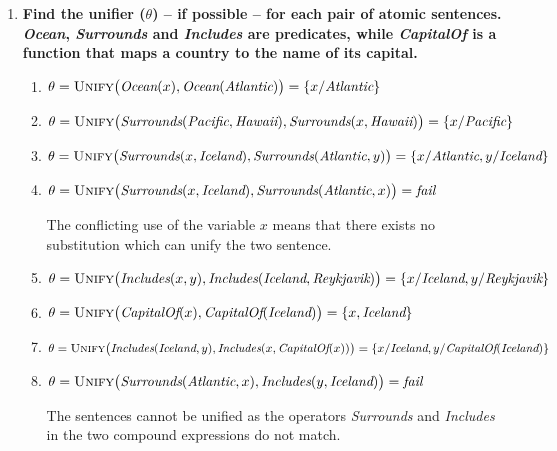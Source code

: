 \begin{enumerate}

\item \textbf{Find the unifier ($\theta$) -- if possible -- for each pair of atomic sentences. \textit{Ocean}, \textit{Surrounds} and \textit{Includes} are predicates, while \textit{CapitalOf} is a function that maps a country to the name of its capital.}

\begin{enumerate}
\item
$\theta = \textsc{Unify}\big(\textit{Ocean}(x), \textit{Ocean}(\textit{Atlantic})\big) = \{x / \textit{Atlantic}\}$

\item
$\theta = \textsc{Unify}\big(\textit{Surrounds}(\textit{Pacific}, \textit{Hawaii}), \textit{Surrounds}(x, \textit{Hawaii})\big) = \{x / \textit{Pacific}\}$

\item
$\theta = \textsc{Unify}\big(\textit{Surrounds}(x, \textit{Iceland}), \textit{Surrounds}(\textit{Atlantic}, y)\big) = \{x / \textit{Atlantic}, y / \textit{Iceland}\}$

\item
$\theta = \textsc{Unify}\big(\textit{Surrounds}(x, \textit{Iceland}), \textit{Surrounds}(\textit{Atlantic}, x)\big) = \textit{fail}$

The conflicting use of the variable $x$ means that there exists no substitution which can unify the two sentence.

\item
$\theta = \textsc{Unify}\big(\textit{Includes}(x, y), \textit{Includes}(\textit{Iceland}, \textit{Reykjavik})\big) = \{x / \textit{Iceland}, y / \textit{Reykjavik}\}$

\item
$\theta = \textsc{Unify}\big(\textit{CapitalOf}(x), \textit{CapitalOf}(\textit{Iceland})\big) = \{x, \textit{Iceland}\}$

\item
$\theta = \textsc{Unify}\big(\textit{Includes}(\textit{Iceland}, y), \textit{Includes}(x, \textit{CapitalOf}(x))\big) = \{x / \textit{Iceland}, y / \textit{CapitalOf}(\textit{Iceland})\}$

\item
$\theta = \textsc{Unify}\big(\textit{Surrounds}(\textit{Atlantic}, x), \textit{Includes}(y, \textit{Iceland})\big) = \textit{fail}$

The sentences cannot be unified as the operators \textit{Surrounds} and \textit{Includes} in the two compound expressions do not match.


\end{enumerate}
\end{enumerate}
